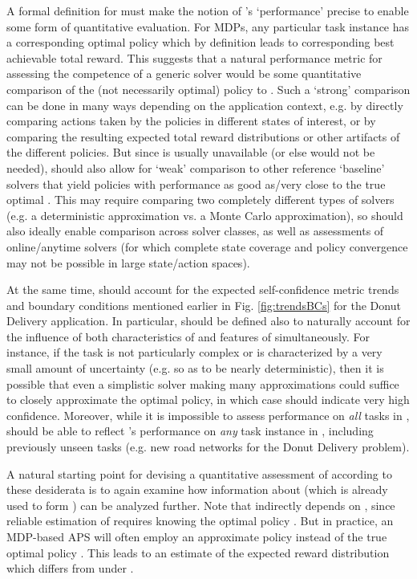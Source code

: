 A formal definition for \xQ{} must make the notion of \solve{}'s `performance' precise to enable some form of quantitative evaluation. For MDPs, any particular task instance \task{} has a corresponding optimal policy \piopt{} which by definition leads to corresponding best achievable total reward. This suggests that a natural performance metric for assessing the competence of a generic solver \solve{} would be some quantitative comparison of the (not necessarily optimal) policy \pigeneric{} to \piopt. Such a `strong' comparison can be done in many ways depending on the application context, e.g. by directly comparing actions taken by the policies in different states of interest, or by comparing the resulting expected total reward distributions or other artifacts of the different policies. 
But since \piopt{} is usually unavailable (or else \solve{} would not be needed), \xQ{} should also allow for `weak' comparison to other reference `baseline' solvers that yield policies with performance as good as/very close to the true optimal \piopt. This may require comparing two completely different types of solvers (e.g. a deterministic approximation vs. a Monte Carlo approximation), so \xQ{} should also ideally enable comparison across solver classes, as well as assessments of online/anytime solvers (for which complete state coverage and policy convergence may not be possible in large state/action spaces).
 
At the same time, \xQ{} should account for the expected self-confidence metric trends and boundary conditions mentioned earlier in Fig. \ref{fig:trendsBCs} for the Donut Delivery application. In particular, \xQ{} should be defined also to naturally account for the influence of both characteristics of \solve{} and features of \task{} simultaneously. For instance, if the task \task{} is not particularly complex or is characterized by a very small amount of uncertainty (e.g. so as to be nearly deterministic), then it is possible that even a simplistic solver making many approximations could suffice to closely approximate the optimal policy, in which case \xQ{} should indicate very high confidence. Moreover, while it is impossible to assess performance on \emph{all} tasks in \taskclass{}, \xQ{} should be able to reflect \solve{}'s performance on \emph{any} task instance \task{} in \taskclass{}, including previously unseen tasks (e.g. new road networks for the Donut Delivery problem). 

A natural starting point for devising a quantitative assessment of \xQ{} according to these desiderata is to again examine how information about \rwdapprox{} (which is already used to form \xO{}) can be analyzed further. 
Note that \xO{} indirectly depends on \xQ{}, since reliable estimation of \rwdoptapprox{} requires knowing the optimal policy \piopt. But in practice, an MDP-based APS will often employ an approximate policy \piapprox{} instead of the true optimal policy \piopt. This leads to an estimate \rwdapprox{} of the expected reward distribution which differs from \rwdopt{} under \piopt.

